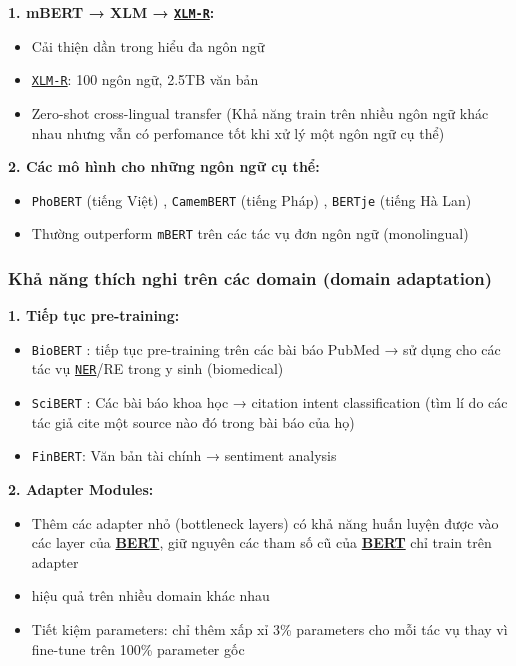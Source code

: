 \textbf{1. mBERT → XLM \cite{conneau2019unsupervised} → \hyperref[acro:xlm-r]{\texttt{XLM-R}}:}
\begin{itemize}
    \item Cải thiện dần trong hiểu đa ngôn ngữ
    \item \hyperref[acro:xlm-r]{\texttt{XLM-R}}: 100 ngôn ngữ, 2.5TB văn bản
    \item Zero-shot cross-lingual transfer (Khả năng train trên nhiều ngôn ngữ khác nhau nhưng vẫn có perfomance tốt khi xử lý một ngôn ngữ cụ thể) 
\end{itemize}

\textbf{2. Các mô hình cho những ngôn ngữ cụ thể:}
\begin{itemize}
    \item \texttt{PhoBERT} (tiếng Việt) \cite{nguyen2020phobert}, \texttt{CamemBERT} (tiếng Pháp) \cite{martin2019camembert}, \texttt{BERTje} (tiếng Hà Lan)
    \item Thường outperform \texttt{mBERT} trên các tác vụ đơn ngôn ngữ (monolingual)
\end{itemize}

\subsubsection{Khả năng thích nghi trên các domain (domain adaptation)}

\textbf{1. Tiếp tục pre-training:}
\begin{itemize}
    \item \texttt{BioBERT} \cite{lee2020biobert}: tiếp tục pre-training trên các bài báo PubMed → sử dụng cho các tác vụ \hyperref[acro:ner]{\texttt{NER}}/RE trong y sinh (biomedical)
    \item \texttt{SciBERT} \cite{beltagy2019scibert}: Các bài báo khoa học → citation intent classification (tìm lí do các tác giả cite một source nào đó trong bài báo của họ)
    \item \texttt{FinBERT}: Văn bản tài chính → sentiment analysis
\end{itemize}

\textbf{2. Adapter Modules:}
\begin{itemize}
    \item Thêm các adapter nhỏ (bottleneck layers) có khả năng huấn luyện được vào các layer của \hyperref[acro:bert]{\textbf{BERT}}, giữ nguyên các tham số cũ của \hyperref[acro:bert]{\textbf{BERT}} chỉ train trên adapter
    \item hiệu quả trên nhiều domain khác nhau
    \item Tiết kiệm parameters: chỉ thêm xấp xỉ 3\% parameters cho mỗi tác vụ thay vì fine-tune trên 100\% parameter gốc
\end{itemize}

